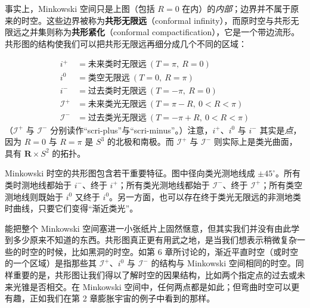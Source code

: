 
事实上，Minkowski 空间只是上图（包括 $R = 0$ 在内）的\emph{内部}；边界并不属于原来的时空。这些边界被称为\textbf{共形无限远}（conformal infinity），而原时空与共形无限远之并集则称为\textbf{共形紧化}（conformal compactification），它是一个带边流形。共形图的结构使我们可以把共形无限远再细分成几个不同的区域：


\begin{equation*}
\begin{aligned}
i^{+} &= \text{未来类时无限远}\ (T=\pi,\ R=0)\\
i^{0} &= \text{类空无限远}\ (T=0,\ R=\pi)\\
i^{-} &= \text{过去类时无限远}\ (T=-\pi,\ R=0)\\
\mathscr{I}^{+} &= \text{未来类光无限远}\ (T=\pi-R,\ 0<R<\pi)\\
\mathscr{I}^{-} &= \text{过去类光无限远}\ (T=-\pi+R,\ 0<R<\pi)
\end{aligned}
\end{equation*}
（$\mathscr{I}^{+}$ 与 $\mathscr{I}^{-}$ 分别读作“scri-plus”与“scri-minus”。）注意，$i^{+}$、$i^{0}$ 与 $i^{-}$ 其实是\emph{点}，因为 $R = 0$ 与 $R = \pi$ 是 $S^{3}$ 的北极和南极。而 $\mathscr{I}^{+}$ 与 $\mathscr{I}^{-}$ 则实际上是类光曲面，具有 $\mathbf{R} \times S^{2}$ 的拓扑。

Minkowski 时空的共形图包含若干重要特征。图中径向类光测地线成 $\pm 45^{\circ}$。所有类时测地线都始于 $i^{-}$、终于 $i^{+}$；所有类光测地线都始于 $\mathscr{I}^{-}$、终于 $\mathscr{I}^{+}$；所有类空测地线则既始于 $i^{0}$ 又终于 $i^{0}$。另一方面，也可以存在终于类光无限远的非测地类时曲线，只要它们变得“渐近类光”。

能把整个 Minkowski 空间塞进一小张纸片上固然惬意，但其实我们并没有由此学到多少原来不知道的东西。共形图真正更有用武之地，是当我们想表示稍微复杂一些的时空的时候，比如黑洞的时空。如第 6 章所讨论的，渐近平直时空（或时空的一个区域）是指那些其 $\mathscr{I}^{+}$、$i^{0}$ 与 $\mathscr{I}^{-}$ 的结构与 Minkowski 空间相同的时空。同样重要的是，共形图让我们得以了解时空的因果结构，比如两个指定点的过去或未来光锥是否相交。在 Minkowski 空间中，任何两点都是如此；但弯曲时空可以更有趣，正如我们在第 2 章膨胀宇宙的例子中看到的那样。

